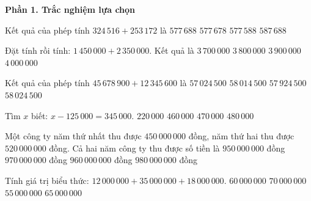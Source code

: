 \textbf{Phần 1. Trắc nghiệm lựa chọn}

\begin{ex} %
Kết quả của phép tính $324\,516 + 253\,172$ là
\choice
{\True $577\,688$}
{$577\,678$}
{$577\,588$}
{$587\,688$}
\end{ex}

\begin{ex} %
Đặt tính rồi tính: $1\,450\,000 + 2\,350\,000$. Kết quả là
\choice
{$3\,700\,000$}
{\True $3\,800\,000$}
{$3\,900\,000$}
{$4\,000\,000$}
\end{ex}

\begin{ex} %
Kết quả của phép tính $45\,678\,900 + 12\,345\,600$ là
\choice
{$57\,024\,500$}
{$58\,014\,500$}
{$57\,924\,500$}
{\True $58\,024\,500$}
\end{ex}

\begin{ex} %
Tìm $x$ biết: $x - 125\,000 = 345\,000$.
\choice
{$220\,000$}
{$460\,000$}
{\True $470\,000$}
{$480\,000$}
\end{ex}

\begin{ex} %
Một công ty năm thứ nhất thu được $450\,000\,000$ đồng, năm thứ hai thu được $520\,000\,000$ đồng. Cả hai năm công ty thu được số tiền là
\choice
{$950\,000\,000$ đồng}
{\True $970\,000\,000$ đồng}
{$960\,000\,000$ đồng}
{$980\,000\,000$ đồng}
\end{ex}

\begin{ex} %
Tính giá trị biểu thức: $12\,000\,000 + 35\,000\,000 + 18\,000\,000$.
\choice
{$60\,000\,000$}
{$70\,000\,000$}
{$55\,000\,000$}
{\True $65\,000\,000$}
\end{ex}

